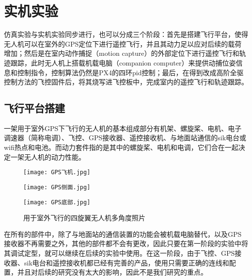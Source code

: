 \chapter{实机实验}
仿真实验与实机实验同步进行，也可以分成三个阶段：首先是搭建飞行平台，使得无人机可以在室外的GPS定位下进行遥控飞行，并且其动力足以应对后续的载荷增加；然后是在室内动作捕捉（motion capture）的外部定位下进行遥控飞行和轨迹跟踪，此时无人机上搭载机载电脑（companion computer）来提供动捕位姿信息和控制指令，控制算法仍然是PX4的四环pid控制；最后，在得到改成高阶全驱控制方法的飞控固件后，将其烧写进飞控板中，完成室内的遥控飞行和轨迹跟踪。
\section{飞行平台搭建}
一架用于室外GPS下飞行的无人机的基本组成部分有机架、螺旋桨、电机、电子调速器（简称电调）、飞控、GPS接收器、遥控接收机、与地面站通信的sik电台或wifi热点和电池。而动力套件指的是其中的螺旋桨、电机和电调，它们合在一起决定一架无人机的动力性能。
\begin{figure}[h]
  \centering
  \begin{minipage}[c]{0.33\textwidth}
    \centering
    \texttt{[image: GPS飞机.jpg]}
  \end{minipage} \hfill
  \begin{minipage}[c]{0.33\textwidth}
    \centering
    \texttt{[image: GPS侧面.jpg]}
  \end{minipage}\hfill
    \begin{minipage}[c]{0.33\textwidth}
      \centering
      \texttt{[image: GPS底部.jpg]}
  \end{minipage}
  \caption{用于室外飞行的四旋翼无人机多角度照片}
  \end{figure}


在所有的部件中，除了与地面站的通信装置的功能会被机载电脑替代，以及GPS接收器不再需要之外，其他的部件都不会有更改，因此只要在第一阶段的实验中将其调试定型，就可以继续在后续的实验中使用。在这一阶段，由于飞控、GPS接收器、sik电台和遥控接收机都已经有完善的产品，使用只需要正确的连线和配置，并且对后续的研究没有太大的影响，因此不是我们研究的重点。

